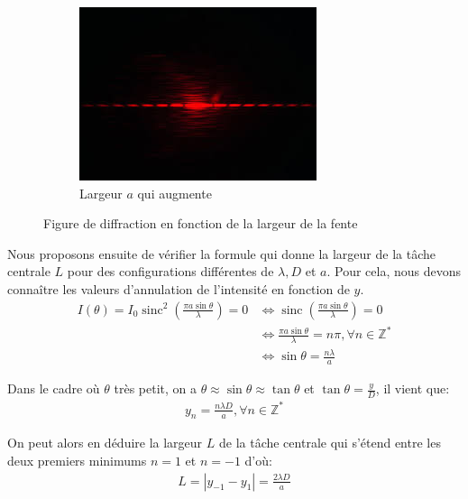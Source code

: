 \documentclass[12pt]{article}
\newcommand{\sinc}{\operatorname{sinc}}
\begin{document}
\begin{figure}[h!]
\begin{subfigure}{.33\textwidth}
        \includegraphics[width=.9\linewidth]{img/a_remplacer_par_nos_images.jpg}
        \caption{Largeur $a$ qui augmente}
        \label{fig:sfig3}
      \end{subfigure}
    \caption{Figure de diffraction en fonction de la largeur de la fente}
    \label{fig:fig}
\end{figure}

\break
Nous proposons ensuite de vérifier la formule qui donne la largeur de la tâche centrale $L$ pour des configurations différentes de $\lambda, D$ et $a$. Pour cela, nous devons
connaître les valeurs d'annulation de l'intensité en fonction de $y$.
\begin{align*}
    I(\theta) = I_0 \sinc^2\left(\frac{\pi a \sin \theta}{\lambda}\right) = 0 & \Leftrightarrow \sinc\left(\frac{\pi a \sin \theta}{\lambda}\right) = 0 \\
    & \Leftrightarrow \frac{\pi a \sin \theta}{\lambda} = n\pi, \forall n \in \mathbb{Z}^* \\
    & \Leftrightarrow \sin \theta = \frac{n\lambda}{a}
\end{align*}

Dans le cadre où $\theta$ très petit, on a $\theta \approx \sin \theta \approx \tan \theta $ et $\tan \theta = \frac{y}{D}$, il vient que:
\begin{align}
    \label{eqn:loi_intensite}
    y_n = \frac{n\lambda D}{a}, \forall n \in \mathbb{Z}^*
\end{align}

On peut alors en déduire la largeur $L$ de la tâche centrale qui s'étend entre les deux premiers minimums $n=1$ et $n=-1$ d'où:
\begin{align}
    L = \left\lvert y_{-1} - y_1 \right\rvert = \frac{2\lambda D}{a}
\end{align}
\end{document}
